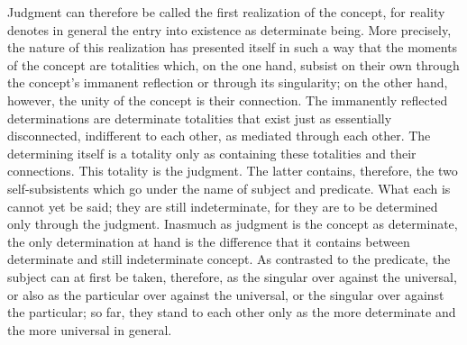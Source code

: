 Judgment can therefore be called
the first realization of the concept,
for reality denotes in general
the entry into existence as determinate being.
More precisely, the nature of this realization
has presented itself in such a way
that the moments of the concept are totalities
which, on the one hand, subsist on their own
through the concept's immanent reflection
or through its singularity;
on the other hand, however, the unity of
the concept is their connection.
The immanently reflected determinations are
determinate totalities that exist just as
essentially disconnected, indifferent to each other,
as mediated through each other.
The determining itself is a totality only as
containing these totalities and their connections.
This totality is the judgment.
The latter contains, therefore, the two self-subsistents
which go under the name of subject and predicate.
What each is cannot yet be said;
they are still indeterminate, for they are
to be determined only through the judgment.
Inasmuch as judgment is the concept as determinate,
the only determination at hand is the difference
that it contains between determinate
and still indeterminate concept.
As contrasted to the predicate,
the subject can at first be taken, therefore,
as the singular over against the universal,
or also as the particular over against the universal,
or the singular over against the particular;
so far, they stand to each other only as the more determinate
and the more universal in general.

